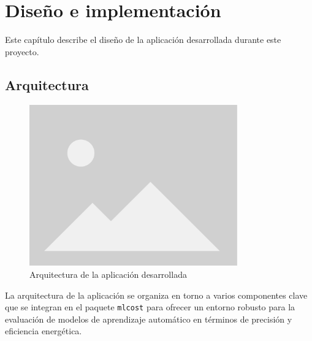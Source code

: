 \chapter{Diseño e implementación}
\label{chap:diseño}

Este capítulo describe el diseño de la aplicación desarrollada durante este proyecto.  


\section{Arquitectura}

\begin{figure}[H]
  \centerline{
     \includegraphics[width=0.8\textwidth, keepaspectratio]{img/placeholder.png}
  }
  \caption{Arquitectura de la aplicación desarrollada}
  \label{fig:app-arch}
\end{figure}

La arquitectura de la aplicación se organiza en torno a varios componentes clave que se integran en el paquete \texttt{mlcost} para ofrecer un entorno robusto para la evaluación de modelos de aprendizaje automático en términos de precisión y eficiencia energética. 

